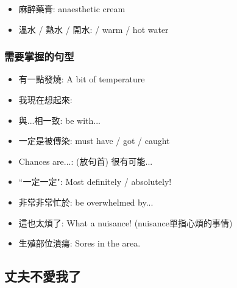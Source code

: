 \begin{multicols}{2}
\begin{itemize}
\begin{center}
  \end{center}
  \item 麻醉藥膏: anaesthetic cream
  \item 溫水 / 熱水 / 開水:  / warm / hot water
\end{itemize}
\end{multicols}

\subsubsection*{需要掌握的句型}
\begin{multicols}{2}
\begin{itemize}
  \itemsep0em
  \item 有一點發燒: A bit of temperature
  \item 我現在想起來: 
  \item 與...相一致: be  with...
  \item 一定是被傳染: must have  / got / caught
  \item Chances are...: (放句首) 很有可能...
  \item ``一定一定": Most definitely / absolutely!
  \item 非常非常忙於: be overwhelmed by...
  \item 這也太煩了: What a nuisance! (nuisance單指心煩的事情)
  \item 生殖部位潰瘍: Sores in the  area.
\end{itemize}
\end{multicols}

\subsection{丈夫不愛我了}
